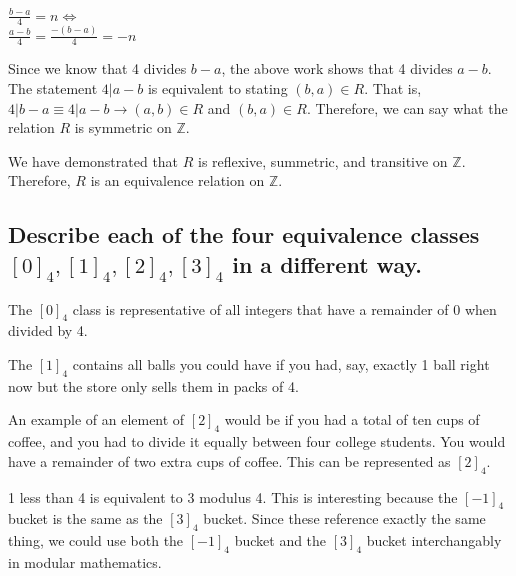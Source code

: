 \begin{center}
   $\frac{b-a}{4} = n \Longleftrightarrow$ \\
   $\frac{a-b}{4} = \frac{-(b-a)}{4} = -n $  \\
\end{center}
Since we know that 4 divides $b - a$, the above work shows that 4 divides $a - b$. The statement $4 | a - b$ is equivalent to stating $(b,a) \in R$. That is, $4 | b-a \equiv 4 | a-b \rightarrow (a,b) \in R$ and $(b,a) \in R$. Therefore, we can say what the relation $R$ is symmetric on $\mathbb{Z}$.

We have demonstrated that $R$ is reflexive, summetric, and transitive on $\mathbb{Z}$. Therefore, $R$ is an equivalence relation on $\mathbb{Z}$.

\subsection{Describe each of the four equivalence classes $[0]_4, [1]_4, [2]_4, [3]_4$ in a different way.}

The $[0]_4$ class is representative of all integers that have a remainder of 0 when divided by 4.

The $[1]_4$ contains all balls you could have if you had, say, exactly 1 ball right now but the store only sells them in packs of 4.

An example of an element of $[2]_4$  would be if you had a total of ten cups of coffee, and you had to divide it equally between four college students. You would have a remainder of two extra cups of coffee. This can be represented as $[2]_4$.

1 less than 4 is equivalent to 3 modulus 4. This is interesting because the $[-1]_4$ bucket is the same as the $[3]_4$ bucket. Since these reference exactly the same thing, we could use both the $[-1]_4$ bucket and the $[3]_4$ bucket interchangably in modular mathematics.